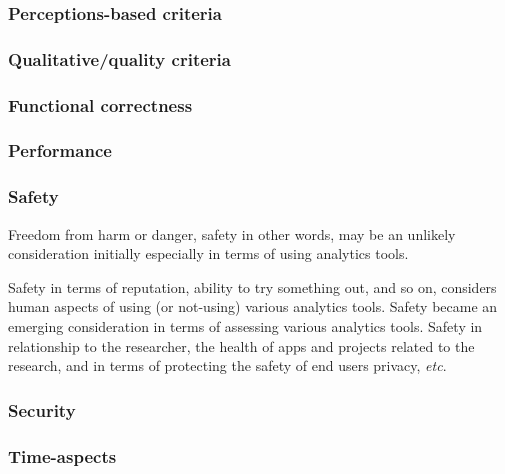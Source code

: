 \subsubsection{Perceptions-based criteria}

\subsubsection{Qualitative/quality criteria}

\subsubsection{Functional correctness}

\subsubsection{Performance}

\subsubsection{Safety}
Freedom from harm or danger, safety in other words, may be an unlikely consideration initially especially in terms of using analytics tools. 

Safety in terms of reputation, ability to try something out, and so on, considers human aspects of using (or not-using) various analytics tools. Safety became an emerging consideration in terms of assessing various analytics tools. Safety in relationship to the researcher, the health of apps and projects related to the research, and in terms of protecting the safety of end users privacy, \emph{etc}.

\subsubsection{Security}

\subsubsection{Time-aspects}

